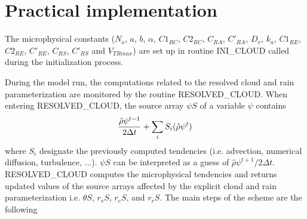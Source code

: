 \section{Practical implementation}

The microphysical constants ($N_o$, $a$, $b$, $\alpha$, $C1_{RC}$, $C2_{RC}$,
$C_{RA}$, $C'_{RA}$, $D_v$, $k_a$, $C1_{RE}$, $C2_{RE}$, $C'_{RE}$, $C_{RS}$,
$C'_{RS}$ and $V_{TRmax}$) are set up in  routine INI\_CLOUD called during the
initialization process.

During the model run,  the computations related to the resolved cloud and rain
parameterization are  monitored by the routine RESOLVED\_CLOUD. When entering
RESOLVED\_CLOUD, the source array $\psi S$ of a variable $\psi$ contains
$$ {\hat \rho \psi^{t-1} \over {2 \Delta t}} + \sum_i S_i(\hat \rho \psi^t) $$
where  $S_i$ designate the previously computed tendencies (i.e. advection,
numerical diffusion, turbulence, ...). $\psi S$ can be interpreted as a guess
of $\hat \rho \psi^{t+1} / 2 \Delta t$.  RESOLVED\_CLOUD computes the
microphysical tendencies and returns updated
values of the source arrays affected by the explicit cloud and rain
parameterization i.e.  $\theta S$, $r_v S$, $r_c S$, and $r_r S$. The main steps
of the scheme are the following

